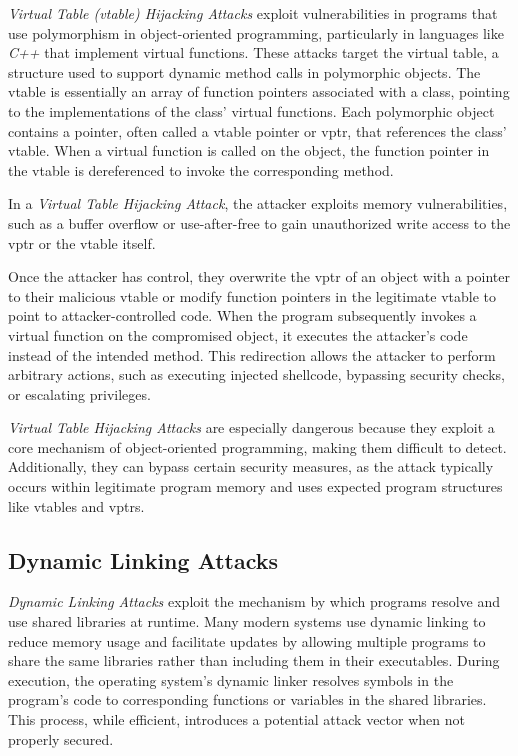 \textit{Virtual Table (vtable) Hijacking Attacks} exploit vulnerabilities in programs
that use polymorphism in object-oriented programming, particularly in languages
like \textit{C++} that implement virtual functions. These attacks target the
virtual table, a structure used to support dynamic method calls in polymorphic objects.
The vtable is essentially an array of function pointers associated with a class,
pointing to the implementations of the class' virtual functions. Each polymorphic
object contains a pointer, often called a vtable pointer or vptr, that references
the class' vtable. When a virtual function is called on the object, the function
pointer in the vtable is dereferenced to invoke the corresponding method.

In a \textit{Virtual Table Hijacking Attack}, the attacker exploits memory
vulnerabilities, such as a buffer overflow or use-after-free to gain unauthorized
write access to the vptr or the vtable itself.

Once the attacker has control, they overwrite the vptr of an object with a
pointer to their malicious vtable or modify function pointers in the legitimate
vtable to point to attacker-controlled code. When the program subsequently invokes
a virtual function on the compromised object, it executes the attacker's code
instead of the intended method. This redirection allows the attacker to perform arbitrary
actions, such as executing injected shellcode, bypassing security checks, or
escalating privileges.

\textit{Virtual Table Hijacking Attacks} are especially dangerous because they exploit
a core mechanism of object-oriented programming, making them difficult to detect.
Additionally, they can bypass certain security measures, as the attack typically
occurs within legitimate program memory and uses expected program structures like
vtables and vptrs.

\subsection{Dynamic Linking Attacks}
\label{subsec:background_dynamiclinking}

\textit{Dynamic Linking Attacks} exploit the mechanism by which programs resolve
and use shared libraries at runtime. Many modern systems use dynamic linking to
reduce memory usage and facilitate updates by allowing multiple programs to
share the same libraries rather than including them in their executables. During
execution, the operating system's dynamic linker resolves symbols in the program's
code to corresponding functions or variables in the shared libraries. This process,
while efficient, introduces a potential attack vector when not properly secured.

